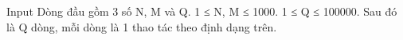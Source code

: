 Input
Dòng đầu gồm 3 số N, M và Q. 1 ≤ N, M ≤ 1000. 1 ≤ Q ≤ 100000. Sau đó là Q dòng, mỗi dòng là 1 thao tác theo định dạng trên.